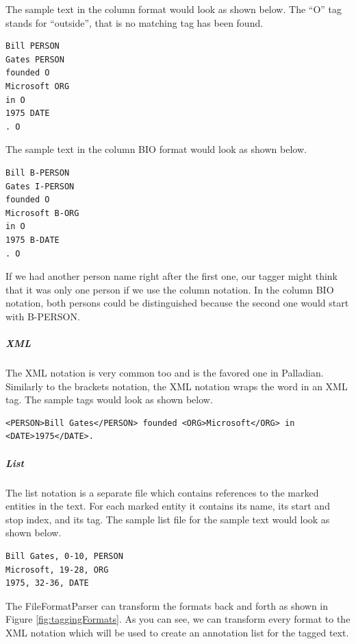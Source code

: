 \documentclass[a4paper,twoside]{book}      %
\begin{document}
The sample text in the column format would look as shown below. The ``O'' tag stands for ``outside'', that is no matching tag has been found.

\begin{verbatim}
Bill PERSON
Gates PERSON
founded O
Microsoft ORG
in O
1975 DATE
. O
\end{verbatim}

The sample text in the column BIO format would look as shown below.

\begin{verbatim}
Bill B-PERSON
Gates I-PERSON
founded O
Microsoft B-ORG
in O
1975 B-DATE
. O
\end{verbatim}

If we had another person name right after the first one, our tagger might think that it was only one person if we use the column notation. In the column BIO notation, both persons could be distinguished because the second one would start with B-PERSON.

\subparagraph{XML} The XML notation is very common too and is the favored one in Palladian. Similarly to the brackets notation, the XML notation wraps the word in an XML tag. The sample tags would look as shown below.

\begin{verbatim}
<PERSON>Bill Gates</PERSON> founded <ORG>Microsoft</ORG> in <DATE>1975</DATE>.
\end{verbatim}

\subparagraph{List} The list notation is a separate file which contains references to the marked entities in the text. For each marked entity it contains its name, its start and stop index, and its tag. The sample list file for the sample text would look as shown below.

\begin{verbatim}
Bill Gates, 0-10, PERSON
Microsoft, 19-28, ORG
1975, 32-36, DATE
\end{verbatim}

The FileFormatParser can transform the formats back and forth as shown in Figure \ref{fig:taggingFormats}. As you can see, we can transform every format to the XML notation which will be used to create an annotation list for the tagged text.
\end{document}
